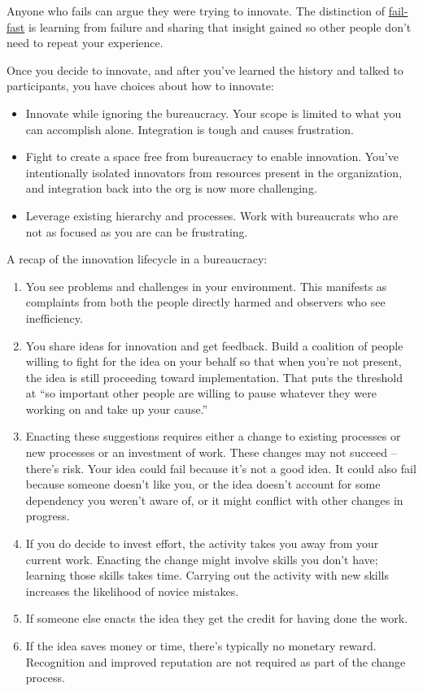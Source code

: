 Anyone who fails can argue they were trying to innovate. The distinction of \href{https://en.wikipedia.org/wiki/Fail-fast#Business}{fail-fast}\iftoggle{WPinmargin}{\marginpar{[Wikipedia] Fail-fast}}{}
 is learning from failure and sharing that insight gained so other people don't need to repeat your experience. 


Once you decide to innovate, and after you've learned the history and talked to participants, you have choices about how to innovate:
\begin{itemize}
\item Innovate while ignoring the bureaucracy. Your scope is limited to what you can accomplish alone. Integration is tough and causes frustration.
\item Fight to create a space free from bureaucracy to enable innovation. You've intentionally isolated innovators from resources present in the organization, and integration back into the org is now more challenging. 
\item Leverage existing hierarchy and processes. Work with bureaucrats who are not as focused as you are can be frustrating.
\end{itemize}


A recap of the innovation lifecycle in a bureaucracy:
\begin{enumerate}
    \item You see problems and challenges in your environment. This manifests as complaints from both the people directly harmed and observers who see inefficiency.
    \item You share ideas for innovation and get feedback. Build a coalition of people willing to fight for the idea on your behalf
    so that when you're not present, the idea is still proceeding toward implementation.  That puts the threshold at ``so important other people are willing to pause whatever they were working on and take up your cause.''
    \item Enacting these suggestions requires either a change to existing processes or new processes or an investment of work. These changes may not succeed -- there's risk. Your idea could fail because it's not a good idea. It could also fail because someone doesn't like you, or the idea doesn't account for some dependency you weren't aware of, or it might conflict with other changes in progress.
    \item If you do decide to invest effort, the activity takes you away from your current work. Enacting the change might involve skills you don't have; learning those skills takes time. Carrying out the activity with new skills increases the likelihood of novice mistakes.
    \item If someone else enacts the idea they get the credit for having done the work.
    \item If the idea saves money or time, there's typically no monetary reward. Recognition and improved reputation are not required as part of the change process. 
\end{enumerate}

